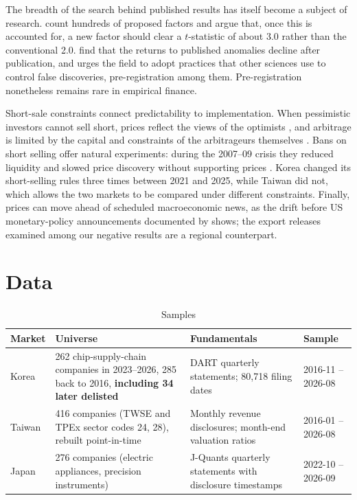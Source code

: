 \documentclass[12pt,a4paper]{article}
\begin{document}
The breadth of the search behind published results has itself become a subject of research. \citet{harvey2016} count
hundreds of proposed factors and argue that, once this is accounted for, a new factor should clear a $t$-statistic of
about 3.0 rather than the conventional 2.0. \citet{mcleanpontiff2016} find that the returns to published anomalies
decline after publication, and \citet{harvey2017} urges the field to adopt practices that other sciences use to
control false discoveries, pre-registration among them. Pre-registration nonetheless remains rare in empirical finance.

Short-sale constraints connect predictability to implementation. When pessimistic investors cannot sell short, prices
reflect the views of the optimists \citep{miller1977}, and arbitrage is limited by the capital and constraints of the
arbitrageurs themselves \citep{shleifervishny1997}. Bans on short selling offer natural experiments: during the
2007--09 crisis they reduced liquidity and slowed price discovery without supporting prices \citep{beberpagano2013}.
Korea changed its short-selling rules three times between 2021 and 2025, while Taiwan did not, which allows the two
markets to be compared under different constraints. Finally, prices can move ahead of scheduled macroeconomic news, as
the drift before US monetary-policy announcements documented by \citet{luccamoench2015} shows; the export releases
examined among our negative results are a regional counterpart.

\section{Data}\label{sec:data}

\begin{table}[htbp]
\centering
\caption{Samples}
\small
\begin{tabularx}{\textwidth}{l L{4.6cm} L{4.2cm} X}
\toprule
Market & Universe & Fundamentals & Sample \\
\midrule
Korea & 262 chip-supply-chain companies in 2023--2026, 285 back to 2016, \textbf{including 34 later delisted} &
DART quarterly statements; 80{,}718 filing dates & 2016-11 -- 2026-08 \\
Taiwan & 416 companies (TWSE and TPEx sector codes 24, 28), rebuilt point-in-time & Monthly revenue disclosures;
month-end valuation ratios & 2016-01 -- 2026-08 \\
Japan & 276 companies (electric appliances, precision instruments) & J-Quants quarterly statements with disclosure
timestamps & 2022-10 -- 2026-09 \\
\bottomrule
\end{tabularx}
\end{table}
\end{document}
